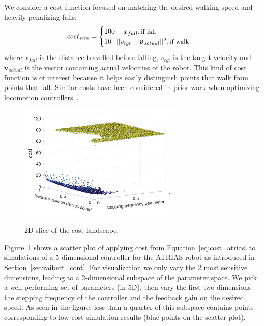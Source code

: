We consider a cost function focused on matching the desired walking speed and heavily penalizing falls:
\begin{equation}
cost_{sim} = 		
    \begin{cases}
		100 - x_{fall} , \text{\small{if fall}} \\
		10 \cdot || v_{tgt} - \pmb{v}_{actual} ||^2, \text{\small{if walk}}\\
	\end{cases}
\label{eq:cost_atrias}
\end{equation}
where $x_{fall}$ is the distance travelled before falling, $v_{tgt}$ is the target velocity and $\pmb{v}_{actual}$ is the vector containing actual velocities of the robot. This kind of cost function is of interest because it helps easily distinguish points that walk from points that fall. Similar costs have been considered in prior work when optimizing locomotion controllers~\citep{song2015neural}.

\begin{figure}[t]
\centering
\caption{\small{2D slice of the cost landscape.}}
\includegraphics[width=0.7\textwidth]{img/costs_atrias.png}
\label{fig:atrias_cost_landscape}
\end{figure}

Figure~\ref{fig:atrias_cost_landscape} shows a scatter plot of applying cost from Equation~\ref{eq:cost_atrias} to simulations of a 5-dimensional controller for the ATRIAS robot as introduced in Section~\ref{sec:raibert_cont}. For visualization we only vary the 2 most sensitive dimensions, leading to a 2-dimensional subspace of the parameter space. We pick a well-performing set of parameters (in 5D), then vary the first two dimensions - the stepping frequency of the controller and the feedback gain on the desired speed. As seen in the figure, less than a quarter of this subspace contains points corresponding to low-cost simulation results (blue points on the scatter plot). 

